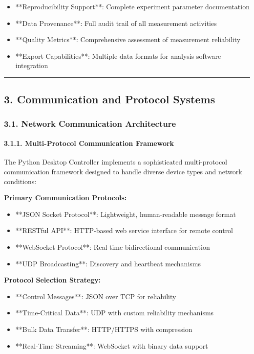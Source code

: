 \documentclass[11pt,a4paper]{article}
\begin{document}
\begin{itemize}
\item **Reproducibility Support**: Complete experiment parameter documentation
\item **Data Provenance**: Full audit trail of all measurement activities
\item **Quality Metrics**: Comprehensive assessment of measurement reliability
\item **Export Capabilities**: Multiple data formats for analysis software integration

\end{itemize}
\hrule

\subsection{3. Communication and Protocol Systems}

\subsubsection{3.1. Network Communication Architecture}

\paragraph{3.1.1. Multi-Protocol Communication Framework}

The Python Desktop Controller implements a sophisticated multi-protocol communication framework designed to handle
diverse device types and network conditions:

\textbf{Primary Communication Protocols:}

\begin{itemize}
\item **JSON Socket Protocol**: Lightweight, human-readable message format
\item **RESTful API**: HTTP-based web service interface for remote control
\item **WebSocket Protocol**: Real-time bidirectional communication
\item **UDP Broadcasting**: Discovery and heartbeat mechanisms

\end{itemize}
\textbf{Protocol Selection Strategy:}

\begin{itemize}
\item **Control Messages**: JSON over TCP for reliability
\item **Time-Critical Data**: UDP with custom reliability mechanisms
\item **Bulk Data Transfer**: HTTP/HTTPS with compression
\item **Real-Time Streaming**: WebSocket with binary data support

\end{itemize}
\end{document}
